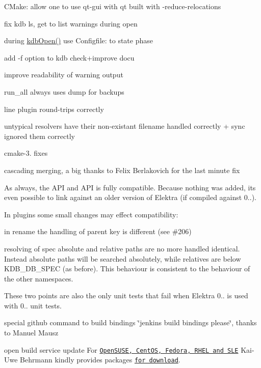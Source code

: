 \begin{DoxyItemize}
\item C\+Make\+: allow one to use qt-\/gui with qt built with -\/reduce-\/relocations
\item fix kdb ls, get to list warnings during open
\item during \hyperlink{group__kdb_ga844e1299a84c3fbf1d3a905c5c893ba5}{kdb\+Open()} use Configfile\+: to state phase
\item add -\/f option to kdb check+improve docu
\item improve readability of warning output
\item run\+\_\+all always uses dump for backups
\item line plugin round-\/trips correctly
\item untypical resolvers have their non-\/existant filename handled correctly + sync ignored them correctly
\item cmake-\/3. fixes
\item cascading merging, a big thanks to Felix Berlakovich for the last minute fix
\end{DoxyItemize}

As always, the A\+PI and A\+PI is fully compatible. Because nothing was added, its even possible to link against an older version of Elektra (if compiled against 0..).

In plugins some small changes may effect compatibility\+:


\begin{DoxyItemize}
\item in rename the handling of parent key is different (see \#206)
\item resolving of spec absolute and relative paths are no more handled identical. Instead absolute paths will be searched absolutely, while relatives are below K\+D\+B\+\_\+\+D\+B\+\_\+\+S\+P\+EC (as before). This behaviour is consistent to the behaviour of the other namespaces.
\end{DoxyItemize}

These two points are also the only unit tests that fail when Elektra 0.. is used with 0.. unit tests.


\begin{DoxyItemize}
\item special github command to build bindings \char`\"{}jenkins build bindings please\char`\"{}, thanks to Manuel Mausz
\item open build service update For \href{https://build.opensuse.org/package/show/home:bekun:devel/elektra}{\tt Open\+S\+U\+SE, Cent\+OS, Fedora, R\+H\+EL and S\+LE} Kai-\/\+Uwe Behrmann kindly provides packages \href{http://software.opensuse.org/download.html?project=home%3Abekun%3Adevel&package=libelektra4}{\tt for download}.
\end{DoxyItemize}

